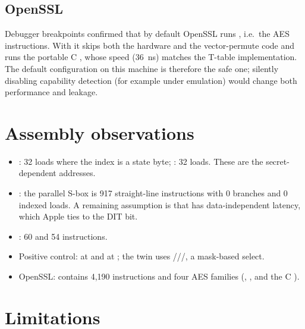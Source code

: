 \subsection{OpenSSL}

Debugger breakpoints confirmed that by default OpenSSL runs , i.e.\ the AES instructions. With  it skips both the hardware and the vector-permute code and runs the portable C , whose speed (36~ns) matches the T-table implementation. The default configuration on this machine is therefore the safe one; silently disabling capability detection (for example under emulation) would change both performance and leakage.

\section{Assembly observations}

\begin{itemize}
  \item {}: 32  loads where the index is a state byte; : 32  loads. These are the secret-dependent addresses.
  \item {}: the parallel S-box is 917 straight-line instructions with 0 branches and 0 indexed loads. A remaining assumption is that  has data-independent latency, which Apple ties to the DIT bit.
  \item {}: 60  and 54  instructions.
  \item Positive control:  at  and  at ; the twin uses ///, a mask-based select.
  \item OpenSSL:  contains 4,190  instructions and four AES families (, ,  and the C ).
\end{itemize}

\section{Limitations}


